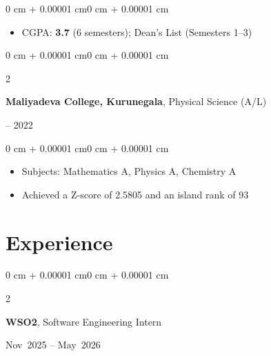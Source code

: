 \documentclass[10pt, letterpaper]{article}
\newenvironment{highlights}{
    \begin{itemize}[
        topsep=0.10 cm,
        parsep=0.10 cm,
        partopsep=0pt,
        itemsep=0pt,
        leftmargin=0 cm + 10pt
    ]
}{
    \end{itemize}
}
\newenvironment{onecolentry}{
    \begin{adjustwidth}{0 cm + 0.00001 cm}{0 cm + 0.00001 cm}
}{
    \end{adjustwidth}
}
\newenvironment{twocolentry}[2][]{
    \onecolentry
    \def\secondColumn{#2}
    \setcolumnwidth{\fill, 4.5 cm}
    \begin{paracol}{2}
}{
    \switchcolumn \raggedleft \secondColumn
    \end{paracol}
    \endonecolentry
}
\begin{document}
    \begin{onecolentry}
        \begin{highlights}
            \item CGPA: \textbf{3.7} (6 semesters); Dean's List (Semesters 1--3)
        \end{highlights}
    \end{onecolentry}

    \vspace{0.2 cm}

    \begin{twocolentry}{
        2019 -- 2022
    }
        \textbf{Maliyadeva College, Kurunegala}, Physical Science (A/L)
    \end{twocolentry}

    \vspace{0.10 cm}

    \begin{onecolentry}
        \begin{highlights}
            \item Subjects: Mathematics A, Physics A, Chemistry A
            \item Achieved a Z-score of 2.5805 and an island rank of 93
        \end{highlights}
    \end{onecolentry}

    \section{Experience}
    \begin{twocolentry}{
    Nov~2025 -- May~2026
    }
    \textbf{WSO2}, Software Engineering Intern
    \end{twocolentry}

    \vspace{0.10 cm}
\end{document}
